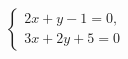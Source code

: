 \begin{ex}
	\begin{condition}
		\( \left\{
		\begin{array}{l}
			2x+y-1=0,\\
			3x+2y+5=0
		\end{array}
		\right. \)
	\end{condition}
\end{ex}